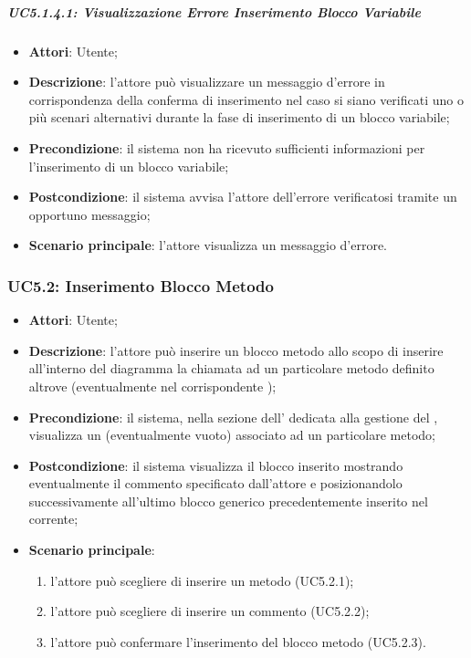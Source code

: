 \subparagraph{UC5.1.4.1: Visualizzazione Errore Inserimento Blocco Variabile	}
\label{UC5.1.4.1}
\begin{itemize}
\item \textbf{Attori}: Utente;
\item \textbf{Descrizione}: l'attore può visualizzare un messaggio d'errore in corrispondenza della conferma di inserimento nel caso si siano verificati uno o più scenari alternativi durante la fase di inserimento di un blocco variabile;	
\item \textbf{Precondizione}: il sistema non ha ricevuto sufficienti informazioni per l'inserimento di un blocco variabile;	
\item \textbf{Postcondizione}: il sistema avvisa l'attore dell'errore verificatosi tramite un opportuno messaggio;	
\item \textbf{Scenario principale}:
l'attore visualizza un messaggio d'errore.	
\end{itemize}

\subsubsection{UC5.2: Inserimento Blocco Metodo}
\label{UC5.2}
\begin{itemize}
\item \textbf{Attori}: Utente;
\item \textbf{Descrizione}: l'attore può inserire un blocco metodo allo scopo di inserire all'interno del diagramma la chiamata ad un particolare metodo definito altrove (eventualmente nel corrispondente );	
\item \textbf{Precondizione}: il sistema, nella sezione dell' dedicata alla gestione del , visualizza un  (eventualmente vuoto) associato ad un particolare metodo;	
\item \textbf{Postcondizione}:  il sistema visualizza il blocco inserito mostrando eventualmente il commento specificato dall'attore e posizionandolo successivamente all'ultimo blocco generico precedentemente inserito nel  corrente;
\item \textbf{Scenario principale}:
\begin{enumerate}
\item l'attore può scegliere di inserire un metodo (UC5.2.1);
\item l'attore può scegliere di inserire un commento (UC5.2.2);
\item l'attore può confermare l'inserimento del blocco metodo (UC5.2.3).
\end{enumerate}
\end{itemize}

